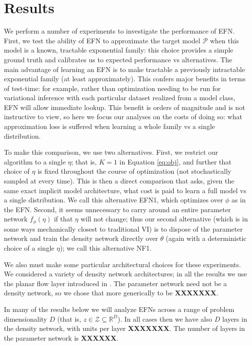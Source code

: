 \documentclass{article}
\begin{document}
  
\section{Results}

We perform a number of experiments to investigate the performance of EFN.  First, we test the ability of EFN to approximate the target model $\mathcal{P}$ when this model is a known, tractable exponential family: this choice provides a simple ground truth and calibrates us to expected performance vs alternatives.    The main advantage of learning an EFN is to make tractable a previously intractable exponential family (at least approximately).  This confers major benefits in terms of test-time: for example, rather than optimization needing to be run for variational inference with each particular dataset realized from a model class, EFN will allow immediate lookup.  This benefit is orders of magnitude and is not instructive to view, so here we focus our analyses on the costs of doing so: what approximation loss is suffered when learning a whole family vs a single distribution.  

To make this comparison, we use two alternatives.  First, we restrict our algorithm to a single $\eta$; that is, $K=1$ in Equation \ref{eq:obj}, and further that choice of $\eta$ is fixed throughout the course of optimization (not stochastically sampled at every time).  This is then a direct comparison that asks, given the same exact implicit model architecture, what cost is paid to learn a full model vs a single distribution.  We call this alternative EFN1, which optimizes over $\phi$ as in the EFN.      Second, it seems unnecessary to carry around an entire parameter network $f_\phi(\eta)$ if that $\eta$ will not change; thus our second alternative (which is in some ways mechanically closest to traditional VI) is to dispose of the parameter network and train the density network directly over $\theta$ (again with a deterministic choice of a single $\eta$); we call this alternative NF1.

We also must make some particular architectural choices for these experiments.  
We considered a variety of density network architectures; in all the results we use the planar flow layer introduced in \cite{rezende2015variational}.  
The parameter network need not be a density network, so we chose that more generically to be {\bf XXXXXXX}.  

In many of the results below we will analyze EFNs across a range of problem dimensionality $D$ (that is, $z \in \mathcal{Z} \subseteq \mathbb{R}^D$).    In all cases then we have also $D$ layers in the density network, with units per layer {\bf XXXXXXX}.  The number of layers in the parameter network is {\bf XXXXXX}.  
\end{document}
